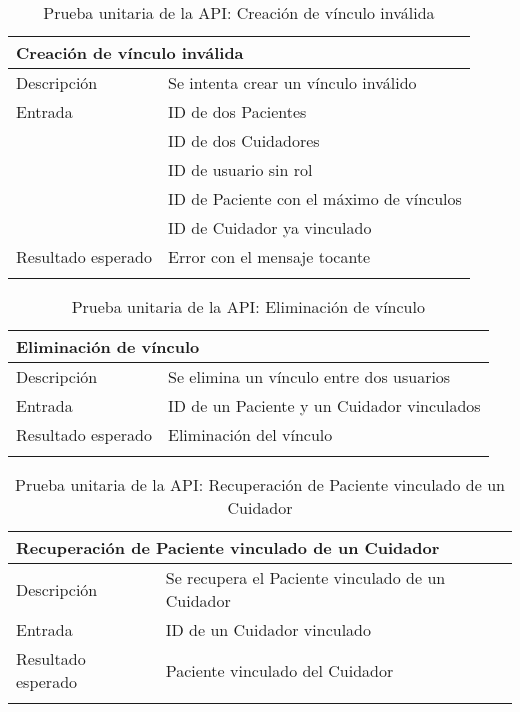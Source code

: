 \begin{longtable}{|p{} p{}|}
    \hline
    \multicolumn{2}{|l|}{\textbf{Creación de vínculo inválida}} \\ \hline 
    Descripción                 & Se intenta crear un vínculo inválido \\ \hline
    Entrada                     & ID de dos Pacientes \\
                                & ID de dos Cuidadores \\
                                & ID de usuario sin rol \\
                                & ID de Paciente con el máximo de vínculos \\
                                & ID de Cuidador ya vinculado \\ \hline
    Resultado esperado          & Error con el mensaje tocante \\  \hline
    \caption{Prueba unitaria de la API: Creación de vínculo inválida}
    \label{cp:u:api:crear_vinculo_invalido}
\end{longtable}

\begin{longtable}{|p{} p{}|}
    \hline
    \multicolumn{2}{|l|}{\textbf{Eliminación de vínculo}} \\ \hline 
    Descripción                 & Se elimina un vínculo entre dos usuarios \\ \hline
    Entrada                     & ID de un Paciente y un Cuidador vinculados \\ \hline
    Resultado esperado          & Eliminación del vínculo \\  \hline
    \caption{Prueba unitaria de la API: Eliminación de vínculo}
    \label{cp:u:api:eliminar_vinculo}
\end{longtable}

\begin{longtable}{|p{} p{}|}
    \hline
    \multicolumn{2}{|l|}{\textbf{Recuperación de Paciente vinculado de un Cuidador}} \\ \hline 
    Descripción                 & Se recupera el Paciente vinculado de un Cuidador \\ \hline
    Entrada                     & ID de un Cuidador vinculado \\ \hline
    Resultado esperado          & Paciente vinculado del Cuidador \\  \hline
    \caption{Prueba unitaria de la API: Recuperación de Paciente vinculado de un Cuidador}
    \label{cp:u:api:recuperar_cared}
\end{longtable}


